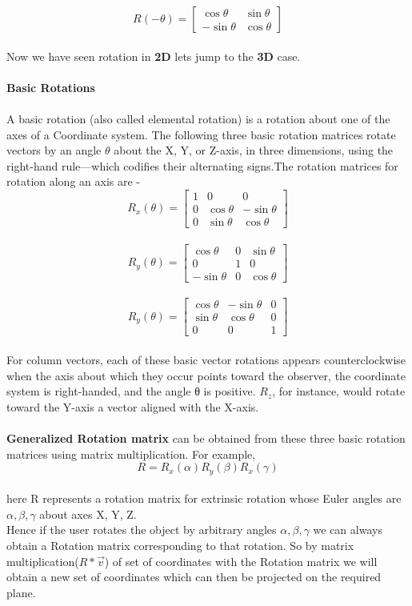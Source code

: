 \documentclass[18pt]{article}
\begin{document}
{$$ R(-\theta) = \begin{bmatrix} 
\cos{\theta} & \sin{\theta} \\
-\sin{\theta} & \cos{\theta}
\end{bmatrix}$$\\
Now we have seen rotation in \textbf{2D} lets jump to the \textbf{3D} case.\\{}\\
\Large{\textbf{Basic Rotations}}{}\\{}\\
\large{A basic rotation (also called elemental rotation) is a rotation about one of the axes of a Coordinate system. The following three basic rotation matrices rotate vectors by an angle $\theta$ about the X, Y, or Z-axis, in three dimensions, using the right-hand rule—which codifies their alternating signs.The rotation matrices for rotation along an axis are -}\\
$$ R_{x}(\theta) = \begin{bmatrix} 
1 & 0 & 0 \\
0 & \cos{\theta} & -\sin{\theta}\\
0 & \sin{\theta} & \cos{\theta}
\end{bmatrix}$$\\
$$ R_{y}(\theta) = \begin{bmatrix} 
\cos{\theta} & 0 & \sin{\theta} \\
0 & 1 & 0\\
 -\sin{\theta} & 0 & \cos{\theta}
\end{bmatrix}$$\\
$$ R_{y}(\theta) = \begin{bmatrix} 
\cos{\theta} &- \sin{\theta} & 0 \\
\sin{\theta} & \cos{\theta} & 0 \\
0 & 0 & 1
\end{bmatrix}$$\\
For column vectors, each of these basic vector rotations appears counterclockwise when the axis about which they occur points toward the observer, the coordinate system is right-handed, and the angle θ is positive. $R_{z}$, for instance, would rotate toward the Y-axis a vector aligned with the X-axis.\\{}\\
\textbf{Generalized Rotation matrix} can be obtained from these three basic rotation matrices using matrix multiplication. For example,
$$R = R_{x}(\alpha)R_{y}(\beta)R_{x}(\gamma)$$\\
here R represents a rotation matrix for extrinsic rotation whose Euler angles are $\alpha,\beta,\gamma$ about axes X, Y, Z.\\
Hence if the user rotates the object by arbitrary angles $\alpha,\beta,\gamma$ we can always obtain a Rotation matrix corresponding to that rotation. So by matrix multiplication($R * \Vec{v}$) of set of coordinates with the Rotation matrix we will obtain a new set of coordinates which can then be projected on the required plane.
}
\end{document}
